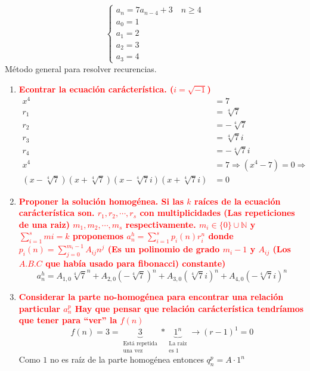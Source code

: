\documentclass[../main.tex]{subfiles}
\begin{document}
\[
	\begin{cases}
		a_n = 7a_{n-4}+3 \quad n \geq 4\\
		a_0 = 1\\
		a_1 = 2\\
		a_2 = 3\\
		a_3 = 4
	\end{cases}
\]
Método general para resolver recurencias.
\begin{enumerate}
	\item \textcolor{red}
		{
			\bfseries\boldmath%
			Econtrar la ecuación carácterística. ($i=\sqrt{-1}$)
		}
		\begin{align*}
			x^4 &= 7\\
			r_1 &= \sqrt[4]{7}\\
			r_2 &= -\sqrt[4]{7}\\
			r_3 &= \sqrt[4]{7}i\\
			r_4 &= -\sqrt[4]{7}i\\
			x^4 &= 7 \Rightarrow (x^4-7) = 0 \Rightarrow\\
			(x-\sqrt[4]{7})
			(x+\sqrt[4]{7})
			(x-\sqrt[4]{7}i)
			(x+\sqrt[4]{7}i) &= 0
		\end{align*}
	\item \textcolor{red}
		{
			\bfseries\boldmath%
			Proponer la solución homogénea.
			Si las $k$ raíces de la ecuación carácterística son.
			$r_1,r_2,\cdots,r_s$ con multiplicidades
			(Las repeticiones de una raiz)
			$m_1,m_2,\cdots,m_s$ respectivamente.
			$m_i\in\{0\}\cup\mathbb{N}$ y $\sum_{i=1}^smi=k$
			proponemos $a_n^h = \sum_{i=1}^sp_i(n)r_i^n$
			donde $p_i(n)=\sum_{j=0}^{m_i-1}A_{ij}n^j$
			(Es un polinomio de grado $m_i-1$ y $A_{ij}$
			(Los $A.B.C$ que había usado para fibonacci)
			constante)
		}
		\[
			a_n^h =
			A_{1,0}\sqrt[4]{7}^n
			+
			A_{2,0}\left(-\sqrt[4]{7}\right)^n
			+
			A_{3,0}\left(\sqrt[4]{7}i\right)^n
			+
			A_{4,0}\left(-\sqrt[4]{7}i\right)^n
		\]
	\item \textcolor{red}
		{
			\bfseries\boldmath%
			Considerar la parte no-homogénea para encontrar una
			relación particular $a_n^p$
			Hay que pensar que relación carácterística tendríamos que
			tener para ``ver'' la $f(n)$
		}
		\[
			f(n) = 3 =
			\underbrace
			{
				3
			}_
			{
				\substack
				{
					\text{Está repetida}\\
					\text{una vez}
				}
			}
			*
			\underbrace
			{
				1^n
			}_
			{
				\substack
				{
					\text{La raiz}\\
					\text{es $1$}
				}
			}
			\rightarrow (r-1)^1 = 0
		\]
		Como $1$ no es raíz de la parte homogénea entonces $q_n^p=A\cdot1^n$


\end{enumerate}
\end{document}
